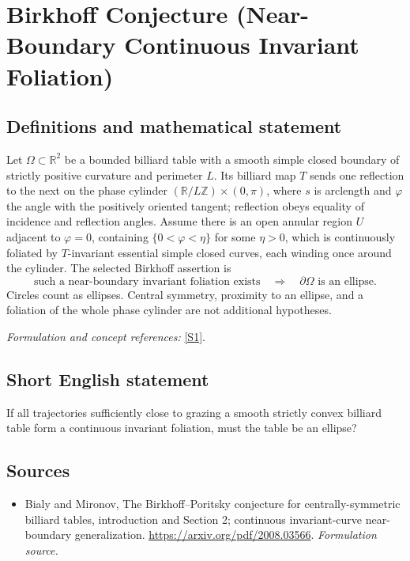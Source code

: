 \documentclass[11pt]{article}
\begin{document}
\section*{\texorpdfstring{Birkhoff Conjecture (Near-Boundary Continuous Invariant Foliation)}{Birkhoff Conjecture (Near-Boundary Continuous Invariant Foliation)}}\label{statement}
\subsection{Definitions and mathematical statement}
Let $\Omega\subset{\mathbb{R}}^2$ be a bounded billiard table with a smooth simple closed boundary of strictly positive curvature and perimeter $L$. Its billiard map $T$ sends one reflection to the next on the phase cylinder $({\mathbb{R}}/L{\mathbb{Z}})\times(0,\pi)$, where $s$ is arclength and $\varphi$ the angle with the positively oriented tangent; reflection obeys equality of incidence and reflection angles. Assume there is an open annular region $U$ adjacent to $\varphi=0$, containing $\{0<\varphi<\eta\}$ for some $\eta>0$, which is continuously foliated by $T$-invariant essential simple closed curves, each winding once around the cylinder. The selected Birkhoff assertion is
\[
 \text{such a near-boundary invariant foliation exists}
 \quad\Longrightarrow\quad\partial\Omega\text{ is an ellipse}.
\]
Circles count as ellipses. Central symmetry, proximity to an ellipse, and a foliation of the whole phase cylinder are not additional hypotheses.
\par\smallskip\textit{Formulation and concept references:} \href{https://arxiv.org/pdf/2008.03566}{[S1]}.

\subsection{Short English statement}
If all trajectories sufficiently close to grazing a smooth strictly convex billiard table form a continuous invariant foliation, must the table be an ellipse?
\subsection{Sources}
\begin{itemize}
\item[S1]Bialy and Mironov, The Birkhoff–Poritsky conjecture for centrally-symmetric billiard tables, introduction and Section 2; continuous invariant-curve near-boundary generalization.
\url{https://arxiv.org/pdf/2008.03566}.
\textit{Formulation source.}
\end{itemize}
\end{document}
